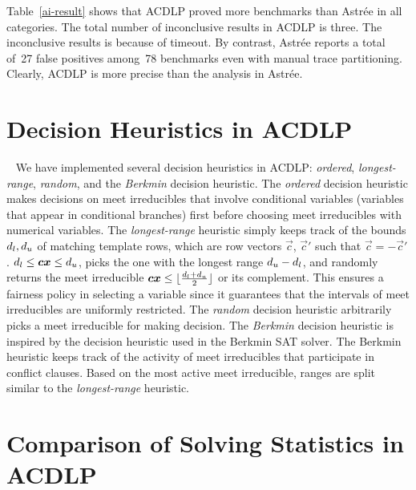 Table~\ref{ai-result} shows that ACDLP proved more benchmarks than
Astr{\'e}e in all categories.  The total number of inconclusive results in
ACDLP is three.  The inconclusive results is because of timeout.  By
contrast, Astr{\'e}e reports a total of~27 false positives among~78
benchmarks even with manual trace partitioning.  Clearly, ACDLP is more
precise than the analysis in Astr{\'e}e.
%
%
\section{Decision Heuristics in ACDLP}~\label{decision}
%
We have implemented several decision heuristics in ACDLP: {\em ordered}, 
{\em longest-range}, {\em random}, and the {\em Berkmin} 
decision heuristic.  The {\em ordered} decision heuristic 
makes decisions on meet irreducibles that involve conditional 
variables (variables that appear in conditional branches) first 
before choosing meet irreducibles with numerical variables.  
%
The {\em longest-range} heuristic simply keeps track of the bounds
$d_l,d_u$ of matching template rows, which are 
row vectors $\vec{c}$, $\vec{c}'$ such that $\vec{c}=-\vec{c}'$.
$d_l\leq {\boldsymbol c}{\boldsymbol x}\leq d_u$, picks the one with the longest range
$d_u-d_l$, and randomly returns the meet irreducible
${\boldsymbol c}{\boldsymbol x}\leq
\lfloor\frac{d_l+d_u}{2}\rfloor$ or its
complement. This ensures a fairness policy in selecting a variable
since it guarantees that the intervals of meet irreducibles are
uniformly restricted.
%
The {\em random} decision heuristic arbitrarily picks a meet irreducible  
for making decision. 
%
%
The {\em Berkmin} decision heuristic is inspired by the 
decision heuristic used in the Berkmin SAT solver.  
The Berkmin heuristic %
keeps track of the activity of %
meet irreducibles that participate in conflict clauses. 
Based on the most active meet irreducible, ranges are split 
similar to the {\em longest-range} heuristic.
%
\section{Comparison of Solving Statistics in ACDLP}
%

%
